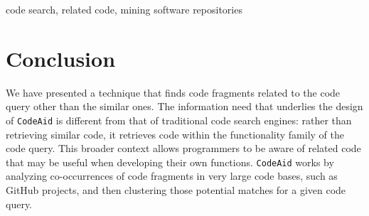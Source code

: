 \documentclass[conference]{IEEEtran}
\newcommand{\ttt}[1]{\tt\small{#1}}
\newcommand{\tool}{{\ttt CodeAid}}
\begin{document}
\begin{abstract}

\end{abstract}

\begin{IEEEkeywords}
code search, related code, mining software repositories
\end{IEEEkeywords}










\section{Conclusion}
\label{sec:conclude}

We have presented a technique that finds code fragments related to the code query other than the similar ones. The
information need that underlies the design of {\tool} is different
from that of traditional code search engines: rather than retrieving
similar code, it retrieves code within the functionality family of the
code query. This broader context allows programmers to be aware of
related code that may be useful when developing their own
functions. {\tool} works by analyzing co-occurrences of code fragments
in very large code bases, such as GitHub projects, and then clustering
those potential matches for a given code query.
\end{document}
